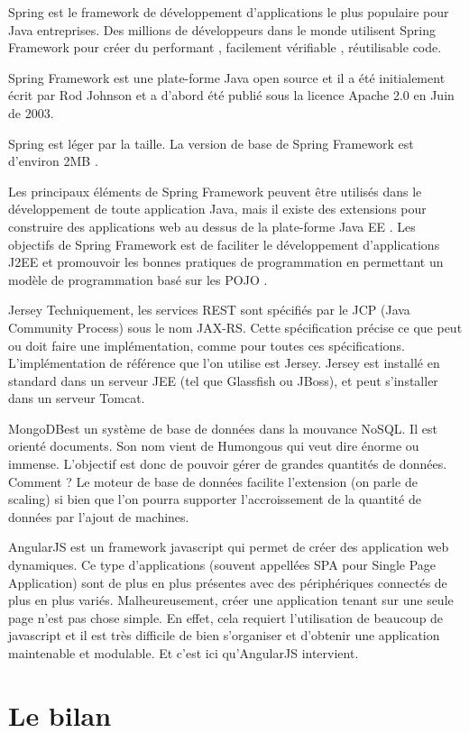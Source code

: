  Spring est le framework de développement d'applications le plus populaire pour Java entreprises. Des millions de développeurs dans le monde utilisent Spring Framework pour créer du performant , facilement vérifiable , réutilisable code.

Spring Framework est une plate-forme Java open source et il a été initialement écrit par Rod Johnson et a d'abord été publié sous la licence Apache 2.0 en Juin de 2003.

Spring est léger par la taille. La version de base de Spring Framework est d'environ 2MB .

Les principaux éléments de Spring Framework peuvent être utilisés dans le développement de toute application Java, mais il existe des extensions pour construire des applications web au dessus de la plate-forme Java EE . Les objectifs de Spring Framework est de faciliter le développement d'applications J2EE et promouvoir les bonnes pratiques de programmation en permettant un modèle de programmation basé sur les POJO .

 Jersey Techniquement, les services REST sont spécifiés par le JCP (Java Community Process) sous le nom JAX-RS. Cette spécification précise ce que peut ou doit faire une implémentation, comme pour toutes ces spécifications. L'implémentation de référence que l'on utilise est Jersey. Jersey est installé en standard dans un serveur JEE (tel que Glassfish ou JBoss), et peut s'installer dans un serveur Tomcat.


 MongoDBest un système de base de données dans la mouvance NoSQL. Il est orienté documents. Son nom vient de Humongous qui veut dire énorme ou immense. L'objectif est donc de pouvoir gérer de grandes quantités de données. Comment ? Le moteur de base de données facilite l'extension (on parle de scaling) si bien que l'on pourra supporter l'accroissement de la quantité de données par l'ajout de machines.


 AngularJS
est un framework javascript qui permet de créer des application web dynamiques. Ce type d'applications (souvent appellées SPA pour
Single Page Application) sont de plus en plus présentes avec des périphériques connectés de plus en plus variés. Malheureusement, créer une application tenant sur une seule page n'est pas chose simple. En effet, cela requiert l'utilisation de beaucoup de javascript et il est très difficile de bien s'organiser et d'obtenir une application maintenable et modulable. Et c'est ici qu'AngularJS intervient.


\section{Le bilan}
\label{lebilan}

